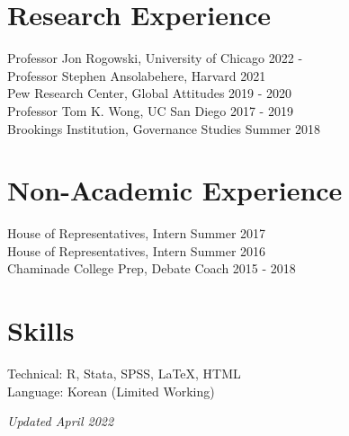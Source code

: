 \documentclass[margin, line]{res}
\begin{document}
\begin{resume}
\section{Research Experience}
Professor Jon Rogowski, University of Chicago \hfill 2022 -\\
Professor Stephen Ansolabehere, Harvard \hfill 2021 \\
Pew Research Center, Global Attitudes \hfill 2019 - 2020\\
Professor Tom K. Wong, UC San Diego \hfill 2017 - 2019\\
Brookings Institution, Governance Studies \hfill Summer 2018

\section{Non-Academic Experience}
House of Representatives, Intern \hfill Summer 2017\\
House of Representatives, Intern \hfill Summer 2016\\
Chaminade College Prep, Debate Coach \hfill 2015 - 2018

\section{Skills}
Technical: R, Stata, SPSS, \LaTeX, HTML\\
Language: Korean (Limited Working)

\hfill \small{\textit{Updated April 2022}}

\end{resume}
\end{document}
